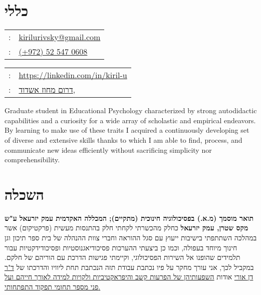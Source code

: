 \setRTL
\hspace{.25\textwidth}
\begin{minipage}[t]{.5\textwidth}
	\par{\par}
\end{minipage}
\section{כללי}
\unsetRTL
\setLTR
\begin{minipage}[t]{.5\linewidth}
	\begin{tabular}{rp{.75\linewidth}}
		\baselineskip=20pt
		\email{} : &\href{mailto:kirilurivsky@gmail.com}{kirilurivsky@gmail.com}\\
		\phone{} : &\href{tel:972525470608}{(+972) 52 547 0608}
	\end{tabular}
\end{minipage}
\begin{minipage}[t]{.5\linewidth}
	\begin{tabular}{rl}
		\linkedin{} : &\href{https://www.linkedin.com/in/kiril-u}{https://linkedin.com/in/kiril-u}\\
		\location{} : &\href{https://goo.gl/maps/MSacjpSy7vZSKykP7}{דרום מחוז אשדוד,}
	\end{tabular}
\end{minipage}	
\unsetLTR
\unsetRTL
\setRTL
\begin{minipage}[t]{1\linewidth}
	\vspace{0.25cm} %
	Graduate student in Educational Psychology characterized by strong autodidactic capabilities and a curiosity for a wide array of scholastic and empirical  endeavors. By learning to make use of these traits I acquired a continuously developing set of diverse and extensive skills thanks to which I am able to find, process, and communicate new ideas efficiently without sacrificing simplicity nor comprehensibility.  
\end{minipage}

\section{השכלה}

{\textbf{תואר מוסמך (מ.א.) בפסיכולוגיה חינוכית (מתקיים); המכללה האקדמית עמק יזרעאל ע"ש מקס שטרן, עמק יזרעאל}}
{כחלק מהכשרתי לקחתי חלק בהתנסות מעשית (פרקטיקום) אשר במהלכה השתתפתי בישיבות ייעוץ עם סגל ההוראה וחברי צוות ההנהלה של בית ספר תיכון וגן חינוך מיוחד בעפולה, וכמו כן ביצעתי ההערכות פסיכודיאגנוסטיות ופסיכודידקטיות עבור תלמידים שהופנו אל השירות הפסיכולוגי, וקיימתי פגישות הדרכת עם הוריהם של חלקם.
	במקביל לכך, אני עורך מחקר על פיו נכתבת עבודת תזה הנכתבת תחת ליוויו והדרכתו של 
	\href{https://www.researchgate.net/scientific-contributions/Orrie-Dan-2172412162}{ד"ר דן אורי} אודות 
	\href{https://tinyurl.com/ADHD-Coping-Seminar}{השפעותיהן של הפרעות קשב והיפראקטיביות ולקויות למידה לאורך חייהם ועל פני מספר תחומי תפקוד התפתחותי.}}
{}

